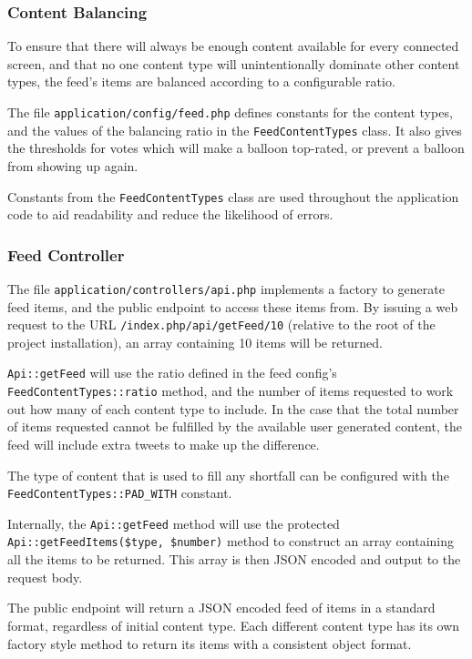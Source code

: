 \subsubsection{Content Balancing}
To ensure that there will always be enough content available for every connected screen, and that no one content type will unintentionally dominate other content types, the feed's items are balanced according to a configurable ratio.

The file \texttt{application/config/feed.php} defines constants for the content types, and the values of the balancing ratio in the \texttt{FeedContentTypes} class. It also gives the thresholds for votes which will make a balloon top-rated, or prevent a balloon from showing up again.

Constants from the \texttt{FeedContentTypes} class are used throughout the application code to aid readability and reduce the likelihood of errors.

\subsubsection{Feed Controller}
The file \texttt{application/controllers/api.php} implements a factory to generate feed items, and the public endpoint to access these items from. By issuing a web request to the URL \texttt{/index.php/api/getFeed/10} (relative to the root of the project installation), an array containing 10 items will be returned.

\texttt{Api::getFeed} will use the ratio defined in the feed config's \texttt{FeedContentTypes::ratio} method, and the number of items requested to work out how many of each content type to include. In the case that the total number of items requested cannot be fulfilled by the available user generated content, the feed will include extra tweets to make up the difference.

The type of content that is used to fill any shortfall can be configured with the \texttt{FeedContentTypes::PAD\_WITH} constant.

Internally, the \texttt{Api::getFeed} method will use the protected \texttt{Api::getFeedItems(\$type, \$number)} method to construct an array containing all the items to be returned. This array is then JSON encoded and output to the request body.

The public endpoint will return a JSON encoded feed of items in a standard format, regardless of initial content type. Each different content type has its own factory style method to return its items with a consistent object format.

